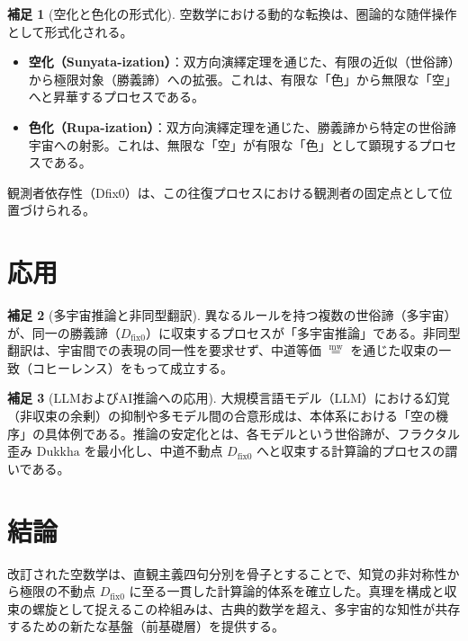 \documentclass[11pt,a4paper]{article}
\newcommand{\mweq}{\mathrel{\overset{\mathrm{mw}}{=}}}
\newcommand{\dfix}{D_{\mathrm{fix}0}}
\newcommand{\Dukkha}{\mathrm{Dukkha}}
\theoremstyle{definition}
\newtheorem{scholium}{補足}[section]
\begin{document}
\begin{scholium}[空化と色化の形式化]
空数学における動的な転換は、圏論的な随伴操作として形式化される。
\begin{itemize}
    \item \textbf{空化（Sunyata-ization）}：双方向演繹定理を通じた、有限の近似（世俗諦）から極限対象（勝義諦）への拡張。これは、有限な「色」から無限な「空」へと昇華するプロセスである。
    \item \textbf{色化（Rupa-ization）}：双方向演繹定理を通じた、勝義諦から特定の世俗諦宇宙への射影。これは、無限な「空」が有限な「色」として顕現するプロセスである。
\end{itemize}
観測者依存性（Dfix0）は、この往復プロセスにおける観測者の固定点として位置づけられる。
\end{scholium}

\section{応用}

\begin{scholium}[多宇宙推論と非同型翻訳]
異なるルールを持つ複数の世俗諦（多宇宙）が、同一の勝義諦（$\dfix$）に収束するプロセスが「多宇宙推論」である。非同型翻訳は、宇宙間での表現の同一性を要求せず、中道等価 $\mweq$ を通じた収束の一致（コヒーレンス）をもって成立する。
\end{scholium}

\begin{scholium}[LLMおよびAI推論への応用]
大規模言語モデル（LLM）における幻覚（非収束の余剰）の抑制や多モデル間の合意形成は、本体系における「空の機序」の具体例である。推論の安定化とは、各モデルという世俗諦が、フラクタル歪み $\Dukkha$ を最小化し、中道不動点 $\dfix$ へと収束する計算論的プロセスの謂いである。
\end{scholium}

\section{結論}
改訂された空数学は、直観主義四句分別を骨子とすることで、知覚の非対称性から極限の不動点 $\dfix$ に至る一貫した計算論的体系を確立した。真理を構成と収束の螺旋として捉えるこの枠組みは、古典的数学を超え、多宇宙的な知性が共存するための新たな基盤（前基礎層）を提供する。
\end{document}
